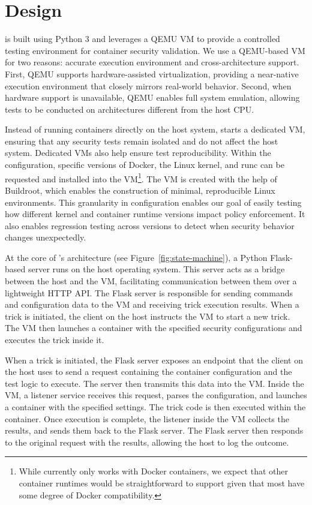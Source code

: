 \section{Design}
\label{sec:design}

\houdini is built using Python 3 and leverages a QEMU VM to provide a controlled testing environment for container security validation. We use a QEMU-based VM for two reasons: accurate execution environment and cross-architecture support. First, QEMU supports hardware-assisted virtualization, providing a near-native execution environment that closely mirrors real-world behavior. Second, when hardware support is unavailable, QEMU enables full system emulation, allowing tests to be conducted on architectures different from the host CPU.

Instead of running containers directly on the host system, \houdini starts a dedicated VM, ensuring that any security tests remain isolated and do not affect the host system. Dedicated VMs also help ensure test reproducibility. Within the \houdini configuration, specific versions of Docker, the Linux kernel, and runc can be requested and installed into the VM\footnote{While \houdini currently only works with Docker containers, we expect that other container runtimes would be straightforward to support given that most have some degree of Docker compatibility.}. The VM is created with the help of Buildroot\cite{buildroot}, which enables the construction of minimal, reproducible Linux environments. 
This granularity in configuration enables our goal of easily testing how different kernel and container runtime versions impact policy enforcement. It also enables regression testing across versions to detect when security behavior changes unexpectedly.

At the core of \houdini's architecture (see Figure~\ref{fig:state-machine}), a Python Flask-based server runs on the host operating system. This server acts as a bridge between the host and the VM, facilitating communication between them over a lightweight HTTP API. The Flask server is responsible for sending commands and configuration data to the VM and receiving trick execution results. When a trick is initiated, the \houdini client on the host instructs the VM to start a new trick. The VM then launches a container with the specified security configurations and executes the trick inside it.

When a trick is initiated, the Flask server exposes an endpoint that the \houdini client on the host uses to send a request containing the container configuration and the test logic to execute. The server then transmits this data into the VM. Inside the VM, a listener service receives this request, parses the configuration, and launches a container with the specified settings. The trick code is then executed within the container. Once execution is complete, the listener inside the VM collects the results, and sends them back to the Flask server. The Flask server then responds to the original request with the results, allowing the host to log the outcome.

